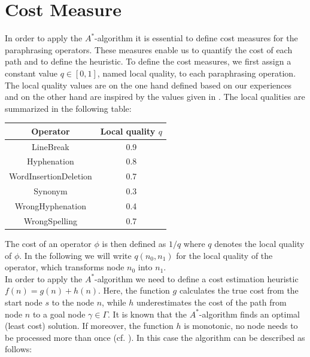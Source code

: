 \documentclass[11pt]{reportAlternative}
\begin{document}
\section{Cost Measure}

In order to apply the $A^*$-algorithm it is essential to define cost measures for the paraphrasing operators. These measures enable us to quantify the cost of each path and to define the heuristic. To define the cost measures, we first assign a constant value $q\in [0,1]$, named local quality, to each paraphrasing operation. The local quality values are on the one hand defined based on our experiences and on the other hand are inspired by the values given in \cite{Stein}. The local qualities are summarized in the following table:


\begin{center}

\begin{tabular}{|c|c|}\hline
   Operator           & Local quality $q$ \\ \hline
   LineBreak          & 0.9 \\ \hline
   Hyphenation        & 0.8 \\ \hline
   WordInsertionDeletion    & 0.7 \\ \hline
   Synonym            & 0.3 \\ \hline
   WrongHyphenation   & 0.4 \\ \hline
   WrongSpelling      & 0.7 \\ \hline
\end{tabular}

\end{center}

The cost of an operator $\phi$ is then defined as $1/q$ where $q$ denotes the local quality of $\phi$. In the following we will write $q(n_0,n_1)$ for the local quality of the operator, which transforms node $n_0$ into $n_1$.\\
In order to apply the $A^*$-algorithm we need to define a cost estimation heuristic $f(n)=g(n)+h(n)$. Here, the function $g$ calculates the true cost from the start node $s$ to
the node $n$, while $h$ underestimates the cost of the path from node $n$ to a goal node $\gamma\in\Gamma$. It is known that the $A^*$-algorithm finds an optimal (least cost) solution. If moreover, the function $h$ is monotonic, no node needs to be processed more than once (cf. \cite{AstarAlgorithm}). In this case the algorithm can be described as follows:\\
\end{document}

